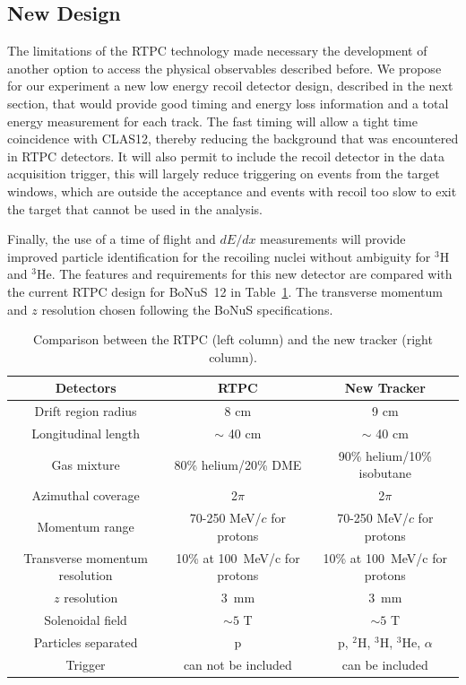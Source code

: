 \subsection{New Design}
The limitations of the RTPC technology made necessary the development of another option to access the physical observables described before. We propose for our experiment a new low energy recoil detector design, described in the next section, that would provide good timing and energy loss information and a total energy measurement for each track. The fast timing will allow a tight time coincidence with CLAS12, thereby reducing the background that was encountered in RTPC detectors. It will also permit to include the recoil detector in the data acquisition trigger, this will largely reduce triggering on events from the target windows, which are outside the acceptance and events with recoil too slow to exit the target that cannot be used in the analysis. 

Finally, the use of a time of flight and $dE/dx$ measurements will provide improved particle identification for the recoiling nuclei without ambiguity for $^3$H and $^3$He. The features and requirements for this new detector are compared with the current RTPC design for BoNuS~12 in Table~\ref{tab:comp}. The transverse momentum and $z$ resolution chosen following the BoNuS specifications.

\begin{table}[ht!]
\caption{\label{tab:comp}Comparison between the RTPC (left column) and the new tracker (right column).}
\begin{tabular}{|c|c|c|}
\hline
\textbf{Detectors}  & \textbf{RTPC}        & \textbf{New Tracker}\\
\hline
Drift region radius & 8 cm                & 9 cm\\
\hline
Longitudinal length & $\sim$ 40 cm         & $\sim$ 40 cm \\
\hline
Gas mixture         & 80\% helium/20\% DME & 90\% helium/10\% isobutane \\
\hline
Azimuthal coverage  & 2$\pi$               & 2$\pi$\\
\hline
Momentum range      & 70-250 MeV/$c$ for protons & 70-250 MeV/$c$ for protons\\
\hline
Transverse momentum resolution & 10\% at 100~MeV/c for protons & 10\% at 100~MeV/c for protons\\
\hline
$z$ resolution & 3~mm & 3~mm \\
\hline
Solenoidal field    & $\sim 5$ T           & $\sim 5$ T \\
\hline
Particles separated & p                    & p, $^2$H, $^3$H, $^3$He, $\alpha$ \\
\hline
Trigger             & can not be included  & can be included \\
\hline
\end{tabular}
\end{table}

